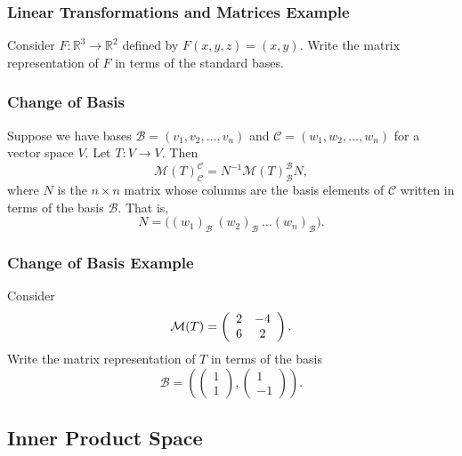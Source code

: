 \documentclass{beamer}
\begin{document}
\begin{frame}[t]
\frametitle{Linear Transformations and Matrices Example}
\begin{Example}
Consider $F:\mathbb{R}^3\to \mathbb{R}^2$ defined by $F(x, y, z) = (x, y)$. Write the matrix representation of $F$ in terms of the standard bases.
\end{Example}

\end{frame}

\begin{frame}
\frametitle{Change of Basis}
Suppose we have bases $\mathcal{B} = (v_1, v_2, \ldots, v_n)$ and $\mathcal{C} = (w_1, w_2, \ldots, w_n)$ for a vector space $V$. Let $T: V\to V$. Then
$$
\mathcal{M}(T)_{\mathcal{C}}^{\mathcal{C}} = N^{-1} \mathcal{M}(T)_{\mathcal{B}}^{\mathcal{B}} N,
$$
where $N$ is the $n\times n$ matrix whose columns are the basis elements of $\mathcal{C}$ written in terms of the basis $\mathcal{B}$. That is,
$$
N = \Big((w_1)_\mathcal{B}\ (w_2)_\mathcal{B}\ \ldots (w_n)_\mathcal{B}\Big).
$$
\end{frame}


\begin{frame}[t]
\frametitle{Change of Basis Example}
\tiny
\begin{Example}
Consider
$$
\mathcal{M}(T) = \left(\begin{array}{c c} 2	&	-4\\ 6		& 2\end{array}\right).
$$
Write the matrix representation of $T$ in terms of the basis
$$
\mathcal{B} = \left(\left(\begin{array}{c} 1\\ 1\end{array}\right), \left(\begin{array}{c} 1\\ -1\end{array}\right)\right).
$$
\end{Example}

\end{frame}

\subsection{Inner Product Space}
\end{document}
